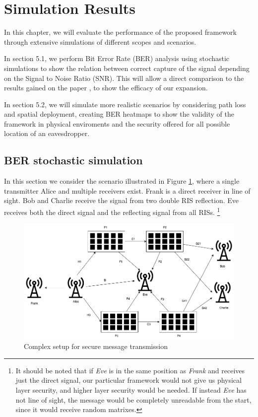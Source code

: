 \section{Simulation Results}

In this chapter, we will evaluate the performance of the proposed framework through extensive simulations of different scopes and scenarios.

In section 5.1, we perform Bit Error Rate (BER) analysis using stochastic simulations to show the relation between correct capture of the signal depending on the Signal to Noise Ratio (SNR). This will allow a direct comparison to the results gained on the paper \cite{9328149}, to show the efficacy of our expansion.

In section 5.2, we will simulate more realistic scenarios by considering path loss and spatial deployment, creating BER heatmaps to show the validity of the framework in physical enviroments and the security offered for all possible location of an eavesdropper.

\subsection{BER stochastic simulation}

In this section we consider the scenario illustrated in Figure \ref{fig:correlation_sk2}, where a single transmitter Alice and multiple receivers exist. Frank is a direct receiver in line of sight. Bob and Charlie receive the signal from two double RIS reflection. Eve receives both the direct signal and the reflecting signal from all RISs. \footnote{It should be noted that if \textit{Eve} is in the same position as \textit{Frank} and receives just the direct signal, our particular framework would not give us physical layer security, and higher layer security would be needed. If instead \textit{Eve} has not line of sight, the message would be completely unreadable from the start, since it would receive random matrixes.}

\begin{figure}[H]
  \centering
  \includegraphics[width=\linewidth]{imgs/complex-situation.png}
  \caption{Complex setup for secure message transmission}
  \label{fig:correlation_sk2}
\end{figure}

